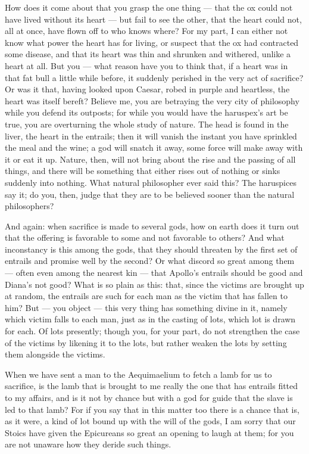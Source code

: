  How does it come about that you grasp the one thing — that the ox could not have lived without its heart — but fail to see the other, that the heart could not, all at once, have flown off to who knows where? For my part, I can either not know what power the heart has for living, or suspect that the ox had contracted some disease, and that its heart was thin and shrunken and withered, unlike a heart at all. But you — what reason have you to think that, if a heart was in that fat bull a little while before, it suddenly perished in the very act of sacrifice? Or was it that, having looked upon Caesar, robed in purple and heartless, the heart was itself bereft? Believe me, you are betraying the very city of philosophy while you defend its outposts; for while you would have the haruspex's art be true, you are overturning the whole study of nature. The head is found in the liver, the heart in the entrails; then it will vanish the instant you have sprinkled the meal and the wine; a god will snatch it away, some force will make away with it or eat it up. Nature, then, will not bring about the rise and the passing of all things, and there will be something that either rises out of nothing or sinks suddenly into nothing. What natural philosopher ever said this? The haruspices say it; do you, then, judge that they are to be believed sooner than the natural philosophers?

 And again: when sacrifice is made to several gods, how on earth does it turn out that the offering is favorable to some and not favorable to others? And what inconstancy is this among the gods, that they should threaten by the first set of entrails and promise well by the second? Or what discord so great among them — often even among the nearest kin — that Apollo's entrails should be good and Diana's not good? What is so plain as this: that, since the victims are brought up at random, the entrails are such for each man as the victim that has fallen to him? But — you object — this very thing has something divine in it, namely which victim falls to each man, just as in the casting of lots, which lot is drawn for each. Of lots presently; though you, for your part, do not strengthen the case of the victims by likening it to the lots, but rather weaken the lots by setting them alongside the victims.

 When we have sent a man to the Aequimaelium to fetch a lamb for us to sacrifice, is the lamb that is brought to me really the one that has entrails fitted to my affairs, and is it not by chance but with a god for guide that the slave is led to that lamb? For if you say that in this matter too there is a chance that is, as it were, a kind of lot bound up with the will of the gods, I am sorry that our Stoics have given the Epicureans so great an opening to laugh at them; for you are not unaware how they deride such things.


